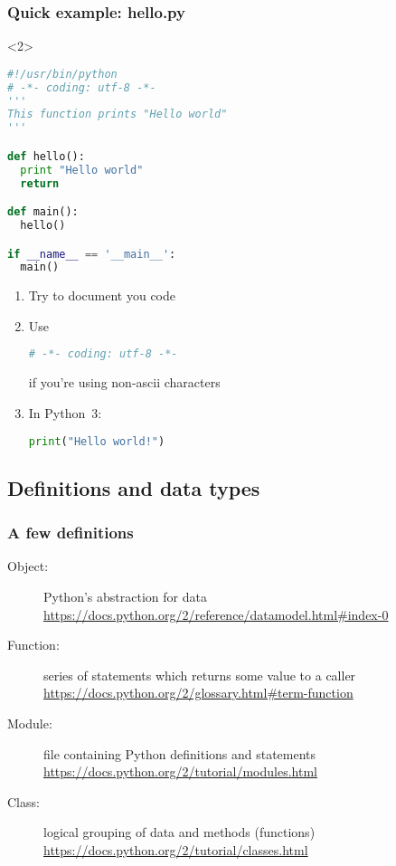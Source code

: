 \begin{frame}[t, fragile]
\frametitle{Quick example: hello.py}
\huge

\faLaptop


\begin{onlyenv}<2>
\begin{lstlisting}[language=python]
#!/usr/bin/python
# -*- coding: utf-8 -*-
'''
This function prints "Hello world"
'''

def hello():
  print "Hello world"
  return

def main():
  hello()

if __name__ == '__main__':
  main()
\end{lstlisting}
\end{onlyenv}

\begin{enumerate}
\item<3-> Try to document you code
\item<4-> Use 
\begin{lstlisting}[language=python]
# -*- coding: utf-8 -*- 
\end{lstlisting}
if you're using non-ascii characters
\item<5-> In Python~3: 
\begin{lstlisting}[language=python]
print("Hello world!")
\end{lstlisting}
\end{enumerate}
\end{frame}

\subsection{Definitions and data types}
\begin{frame}[fragile]
\frametitle{A few definitions}

\begin{description}
\item[Object:] Python's abstraction for data\\
\url{https://docs.python.org/2/reference/datamodel.html#index-0}
\item[Function:] series of statements which returns some value to a caller\\
\url{https://docs.python.org/2/glossary.html#term-function}
\item[Module:] file containing Python definitions and statements\\
\url{https://docs.python.org/2/tutorial/modules.html}
\item[Class:] logical grouping of data and methods (functions)\\
\url{https://docs.python.org/2/tutorial/classes.html}
\end{description}

\end{frame}


